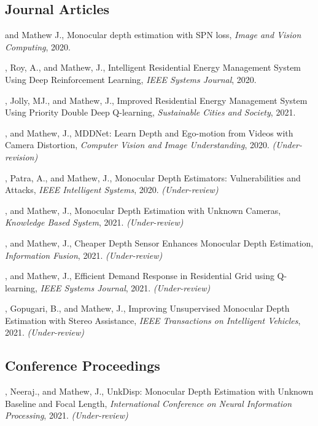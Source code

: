 \documentclass[mm]{simple_style}
\begin{document}
\begin{resume}
\subsection{Journal Articles}
\vspace{-2ex}

 and Mathew J., Monocular depth estimation with SPN loss, \textit{Image and Vision Computing}, 2020.

, Roy, A.,  and Mathew, J., Intelligent Residential Energy Management System Using Deep Reinforcement Learning, \textit{IEEE Systems Journal}, 2020.

, Jolly, MJ., and Mathew, J., Improved Residential Energy Management System Using Priority Double Deep Q-learning, \textit{Sustainable Cities and Society}, 2021.

, and Mathew, J., MDDNet: Learn Depth and Ego-motion from Videos with Camera Distortion, \textit{Computer Vision and Image Understanding}, 2020. \textit{(Under-revision)}

, Patra, A., and Mathew, J., Monocular Depth Estimators: Vulnerabilities and Attacks, \textit{IEEE Intelligent Systems}, 2020. \textit{(Under-review)}

, and Mathew, J., Monocular Depth Estimation with Unknown Cameras, \textit{Knowledge Based System}, 2021. \textit{(Under-review)}

, and Mathew, J., Cheaper Depth Sensor Enhances
Monocular Depth Estimation, \textit{Information Fusion}, 2021. \textit{(Under-review)}

, and Mathew, J., Efficient Demand Response in Residential Grid using Q-learning, \textit{IEEE Systems Journal}, 2021. \textit{(Under-review)}

, Gopugari, B., and Mathew, J., Improving Unsupervised Monocular Depth
Estimation with Stereo Assistance, \textit{IEEE Transactions on Intelligent Vehicles}, 2021. \textit{(Under-review)}
\halfsectionline
\vspace{-12mm}
\subsection{Conference Proceedings}
\vspace{-2ex}

, Neeraj., and Mathew, J., UnkDisp: Monocular Depth Estimation with
Unknown Baseline and Focal Length, \textit{International Conference on Neural Information Processing}, 2021. \textit{(Under-review)}


\end{resume}
\end{document}
